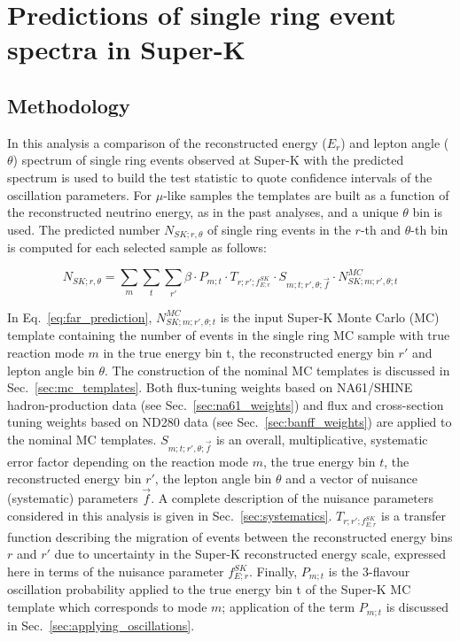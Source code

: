 \clearpage

\section {Predictions of single ring event spectra in Super-K}
\label{sec:spectrum_prediction}

\subsection {Methodology}

In this analysis a comparison of 
the reconstructed energy ($E_{r}$) and lepton angle ($\theta$) spectrum
of single ring events observed at Super-K with the predicted spectrum
is used to build the test statistic to quote confidence intervals of the oscillation parameters.
For $\mu$-like samples the templates are built as a function of the reconstructed neutrino energy,
as in the past analyses, and a unique $\theta$ bin is used.
The predicted number $N_{SK;r,\theta}$ 
of single ring events in the $r$-th and $\theta$-th bin
is computed for each selected sample as follows:

\begin{equation}
\displaystyle
  N_{SK;r,\theta} = 
    \sum_{m} \sum_{t} \sum_{r\prime}
    	\beta \cdot
        P_{m;t} \cdot
        T_{r;r\prime;f_{E; r}^{SK}} \cdot
        S_{m;t;r\prime,\theta;\vec{f}} \cdot
        N_{SK;m;r\prime,\theta;t}^{MC} 
         \label{eq:far_prediction}
\end{equation}

In Eq.~\ref{eq:far_prediction}, $N_{SK;m;r\prime,\theta;t}^{MC}$ is the input Super-K Monte Carlo (MC) template 
containing the number of events in the single ring MC sample with true reaction mode $m$ in the 
true energy bin t, the reconstructed energy bin $r\prime$ and lepton angle bin $\theta$.
The construction of the nominal MC templates is discussed in Sec.~\ref{sec:mc_templates}.
Both flux-tuning weights based on NA61/SHINE hadron-production data (see Sec.~\ref{sec:na61_weights})
and flux and cross-section tuning weights based on ND280 data (see Sec.~\ref{sec:banff_weights})
are applied to the nominal MC templates.
$S_{m;t;r\prime,\theta;\vec{f}}$ is an overall, multiplicative, systematic error factor 
depending on the reaction mode $m$, the true energy bin $t$, the reconstructed energy bin $r\prime$,
the lepton angle bin $\theta$  
and a vector of nuisance (systematic) parameters $\vec{f}$. 
A complete description of the nuisance parameters considered in this analysis is given in Sec.~\ref{sec:systematics}.
$T_{r;r\prime;f_{E; r}^{SK}}$ is a transfer function describing the migration of events
between the reconstructed energy bins $r$ and $r\prime$ due to uncertainty in the Super-K reconstructed energy
scale, expressed here in terms of the nuisance parameter $f_{E; r}^{SK}$.
Finally, $P_{m;t}$ is the 3-flavour oscillation probability applied to the true energy
bin t of the Super-K MC template which corresponds to mode $m$;
application of the term $P_{m;t}$ is discussed in Sec.~\ref{sec:applying_oscillations}.


